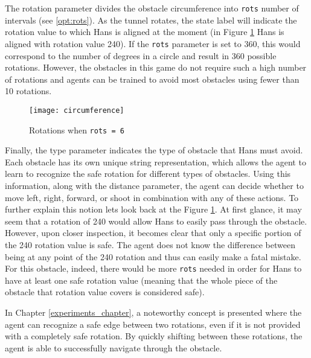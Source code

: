 The rotation parameter divides the obstacle circumference into \texttt{rots} number of intervals (see \ref{opt:rots}). As the tunnel rotates, the state label will indicate the rotation value to which Hans is aligned at the moment (in Figure \ref{fig:circumference} Hans is aligned with rotation value 240). If the \texttt{rots} parameter is set to 360, this would correspond to the number of degrees in a circle and result in 360 possible rotations. However, the obstacles in this game do not require such a high number of rotations and agents can be trained to avoid most obstacles using fewer than 10 rotations. 

\begin{figure}[h]
    \centering
    \texttt{[image: circumference]}
    \caption{Rotations when \texttt{rots = 6}}
    \label{fig:circumference}
\end{figure}

Finally, the type parameter indicates the type of obstacle that Hans must avoid. Each obstacle has its own unique string representation, which allows the agent to learn to recognize the safe rotation for different types of obstacles. Using this information, along with the distance parameter, the agent can decide whether to move left, right, forward, or shoot in combination with any of these actions. To further explain this notion lets look back at the Figure \ref{fig:circumference}. At first glance, it may seem that a rotation of 240 would allow Hans to easily pass through the obstacle. However, upon closer inspection, it becomes clear that only a specific portion of the 240 rotation value is safe. The agent does not know the difference between being at any point of the 240 rotation and thus can easily make a fatal mistake. For this obstacle, indeed, there would be more \texttt{rots} needed in order for Hans to have at least one safe rotation value (meaning that the whole piece of the obstacle that rotation value covers is considered safe).

In Chapter \ref{experiments_chapter}, a noteworthy concept is presented where the agent can recognize a safe edge between two rotations, even if it is not provided with a completely safe rotation. By quickly shifting between these rotations, the agent is able to successfully navigate through the obstacle.

